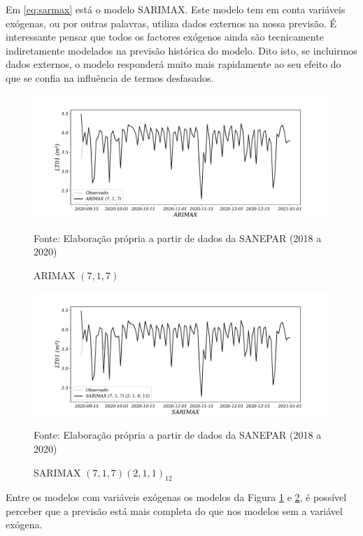 Em \eqref{eq:sarmax} está o modelo SARIMAX. Este modelo tem em conta variáveis exógenas, ou por outras palavras, utiliza dados externos na nossa previsão. É interessante pensar que todos os factores exógenos ainda são tecnicamente indiretamente modelados na previsão histórica do modelo. Dito isto, se incluirmos dados externos, o modelo responderá muito mais rapidamente ao seu efeito do que se confia na influência de termos desfasados.

\begin{figure}[H]
	\centering
	\caption{ARIMAX $(7,1,7)$  }
	\label{fig:1-arimax}
	\includegraphics[width=1\linewidth]{Modelos/Figuras/1-ARIMAX}
	
	Fonte: Elaboração própria a partir de dados da SANEPAR (2018 a 2020)
\end{figure}

\begin{figure}[H]
	\centering
	\caption{SARIMAX $(7,1,7) (2,1,1)_{12}$  }
	\label{fig:1-sarimax}
	\includegraphics[width=1\linewidth]{Modelos/Figuras/1-SARIMAX}
	
	Fonte: Elaboração própria a partir de dados da SANEPAR (2018 a 2020)
\end{figure}


Entre os modelos com variáveis exógenas os modelos da Figura \ref{fig:1-arimax} e \ref{fig:1-sarimax}, é possível perceber que a previsão está mais completa do que nos modelos sem a variável exógena.

